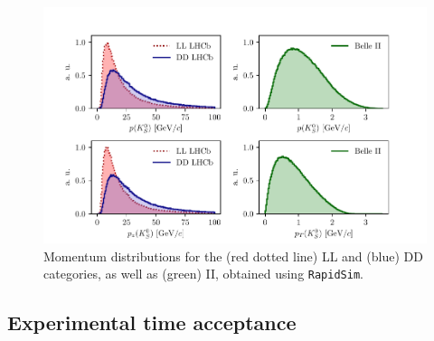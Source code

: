 \begin{figure}[tbp]
    \centering
    \includegraphics[width=0.98\columnwidth]{figures/ks_chapter/momentum_distributions.pdf}
    \caption{Momentum distributions for the \lhcb (red dotted line) LL and (blue) DD categories, as well as (green) \belle II, obtained using \texttt{RapidSim}.}
    \label{fig:momentum}
\end{figure}



\subsection{Experimental time acceptance} %
\label{sub:experimental_time_acceptance}

